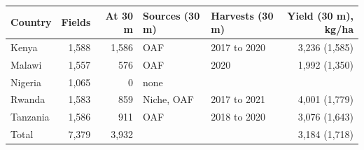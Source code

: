 \begin{tabular}{@{}lrrllr@{}}
\toprule
Country & Fields & At 30 m & Sources (30 m) & Harvests (30 m) & Yield (30 m), kg/ha \\
\midrule
Kenya & 1{,}588 & 1{,}586 & OAF & 2017 to 2020 & 3{,}236 (1{,}585) \\
Malawi & 1{,}557 & 576 & OAF & 2020 & 1{,}992 (1{,}350) \\
Nigeria & 1{,}065 & 0 & none &  &  \\
Rwanda & 1{,}583 & 859 & Niche, OAF & 2017 to 2021 & 4{,}001 (1{,}779) \\
Tanzania & 1{,}586 & 911 & OAF & 2018 to 2020 & 3{,}076 (1{,}643) \\
\midrule
Total & 7{,}379 & 3{,}932 & & & 3{,}184 (1{,}718) \\
\bottomrule
\end{tabular}
